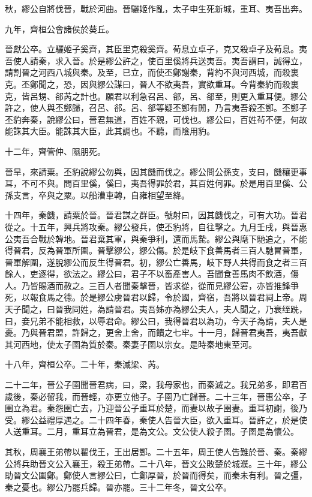 秋，繆公自將伐晉，戰於河曲。晉驪姬作亂，太子申生死新城，重耳、夷吾出奔。

九年，齊桓公會諸侯於葵丘。

晉獻公卒。立驪姬子奚齊，其臣里克殺奚齊。荀息立卓子，克又殺卓子及荀息。夷吾使人請秦，求入晉。於是繆公許之，使百里傒將兵送夷吾。夷吾謂曰，誠得立，請割晉之河西八城與秦。及至，已立，而使丕鄭謝秦，背約不與河西城，而殺裏克。丕鄭聞之，恐，因與繆公謀曰，晉人不欲夷吾，實欲重耳。今背秦約而殺裏克，皆呂甥、郤芮之計也。願君以利急召呂、郤，呂、郤至，則更入重耳便。繆公許之，使人與丕鄭歸，召呂、郤。呂、郤等疑丕鄭有閒，乃言夷吾殺丕鄭。丕鄭子丕豹奔秦，說繆公曰，晉君無道，百姓不親，可伐也。繆公曰，百姓茍不便，何故能誅其大臣。能誅其大臣，此其調也。不聽，而陰用豹。

十二年，齊管仲、隰朋死。

晉旱，來請粟。丕豹說繆公勿與，因其饑而伐之。繆公問公孫支，支曰，饑穰更事耳，不可不與。問百里傒，傒曰，夷吾得罪於君，其百姓何罪。於是用百里傒、公孫支言，卒與之粟。以船漕車轉，自雍相望至絳。

十四年，秦饑，請粟於晉。晉君謀之群臣。虢射曰，因其饑伐之，可有大功。晉君從之。十五年，興兵將攻秦。繆公發兵，使丕豹將，自往擊之。九月壬戌，與晉惠公夷吾合戰於韓地。晉君棄其軍，與秦爭利，還而馬騺。繆公與麾下馳追之，不能得晉君，反為晉軍所圍。晉擊繆公，繆公傷。於是岐下食善馬者三百人馳冒晉軍，晉軍解圍，遂脫繆公而反生得晉君。初，繆公亡善馬，岐下野人共得而食之者三百餘人，吏逐得，欲法之。繆公曰，君子不以畜產害人。吾聞食善馬肉不飲酒，傷人。乃皆賜酒而赦之。三百人者聞秦擊晉，皆求從，從而見繆公窘，亦皆推鋒爭死，以報食馬之德。於是繆公虜晉君以歸，令於國，齊宿，吾將以晉君祠上帝。周天子聞之，曰晉我同姓，為請晉君。夷吾姊亦為繆公夫人，夫人聞之，乃衰绖跣，曰，妾兄弟不能相救，以辱君命。繆公曰，我得晉君以為功，今天子為請，夫人是憂。乃與晉君盟，許歸之，更舍上舍，而饋之七牢。十一月，歸晉君夷吾，夷吾獻其河西地，使太子圉為質於秦。秦妻子圉以宗女。是時秦地東至河。

十八年，齊桓公卒。二十年，秦滅梁、芮。

二十二年，晉公子圉聞晉君病，曰，梁，我母家也，而秦滅之。我兄弟多，即君百歲後，秦必留我，而晉輕，亦更立他子。子圉乃亡歸晉。二十三年，晉惠公卒，子圉立為君。秦怨圉亡去，乃迎晉公子重耳於楚，而妻以故子圉妻。重耳初謝，後乃受。繆公益禮厚遇之。二十四年春，秦使人告晉大臣，欲入重耳。晉許之，於是使人送重耳。二月，重耳立為晉君，是為文公。文公使人殺子圉。子圉是為懷公。

其秋，周襄王弟帶以翟伐王，王出居鄭。二十五年，周王使人告難於晉、秦。秦繆公將兵助晉文公入襄王，殺王弟帶。二十八年，晉文公敗楚於城濮。三十年，繆公助晉文公圍鄭。鄭使人言繆公曰，亡鄭厚晉，於晉而得矣，而秦未有利。晉之彊，秦之憂也。繆公乃罷兵歸。晉亦罷。三十二年冬，晉文公卒。

